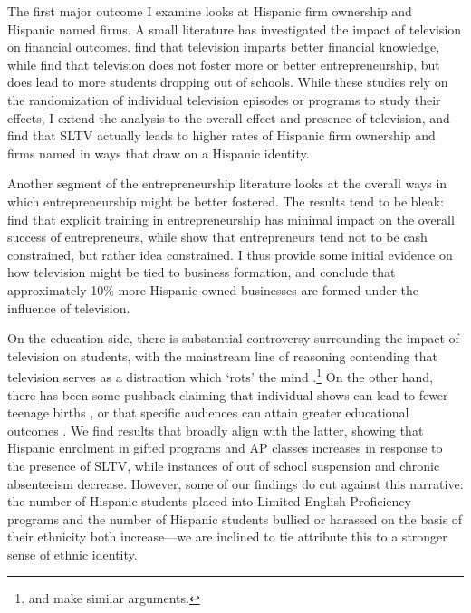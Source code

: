 \documentclass[11pt]{article}
\begin{document}
The first major outcome I examine looks at Hispanic firm ownership and Hispanic named firms. A small literature has investigated the impact of television on financial outcomes. \cite{bjorvatn_teaching_2019} find that television imparts better financial knowledge, while \cite{berg_harnessing_2017} find that television does not foster more or better entrepreneurship, but does lead to more students dropping out of schools. While these studies rely on the randomization of individual television episodes or programs to study their effects, I extend the analysis to the overall effect and presence of television, and find that SLTV actually leads to higher rates of Hispanic firm ownership and firms named in ways that draw on a Hispanic identity.

Another segment of the entrepreneurship literature looks at the overall ways in which entrepreneurship might be better fostered. The results tend to be bleak: \cite{karlan_teaching_2011} find that explicit training in entrepreneurship has minimal impact on the overall success of entrepreneurs, while \cite{gine_money_2014} show that entrepreneurs tend not to be cash constrained, but rather idea constrained. I thus provide some initial evidence on how television might be tied to business formation, and conclude that approximately 10\% more Hispanic-owned businesses are formed under the influence of television. 


On the education side, there is substantial controversy surrounding the impact of television on students, with the mainstream line of reasoning contending that television serves as a distraction which `rots' the mind \citep{zavodny_does_2006}.\footnote{ \cite{winn_plug-drug_2002} and \cite{gentile_well-child_2004} make similar arguments.} On the other hand, there has been some pushback claiming that individual shows can lead to fewer teenage births \citep{kearney_media_2015}, or that specific audiences can attain greater educational outcomes \citep{gentzkow_preschool_2008}. We find results that broadly align with the latter, showing that Hispanic enrolment in gifted programs and AP classes increases in response to the presence of SLTV, while instances of out of school suspension and chronic absenteeism decrease. However, some of our findings do cut against this narrative: the number of Hispanic students placed into Limited English Proficiency programs and the number of Hispanic students bullied or harassed on the basis of their ethnicity both increase---we are inclined to tie attribute this to a stronger sense of ethnic identity.
\end{document}
